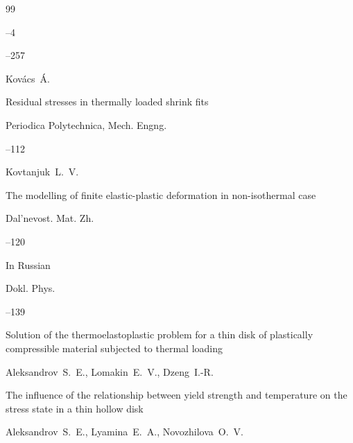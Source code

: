 \begin{thebibliography}{99}


--4

--257









\by Kov\'acs~\'A.

\paper Residual stresses in thermally loaded shrink fits


\jour Periodica Polytechnica, Mech. Engng.



--112




\by Kovtanjuk~L.~V.

\paper The modelling of finite elastic-plastic deformation in non-isothermal case

\jour Dal'nevost. Mat. Zh.




--120

\lang In Russian




\jour Dokl. Phys. 




–139

\paper Solution of the thermoelastoplastic problem for a thin disk of plastically compressible material subjected to thermal loading

\by Aleksandrov~S.~E., Lomakin~E.~V.,  Dzeng~I.-R.





\paper The influence of the relationship between yield strength and temperature on the stress state in a thin hollow disk

\by Aleksandrov~S.~E., Lyamina~E.~A., Novozhilova~O.~V.


\end{thebibliography}
